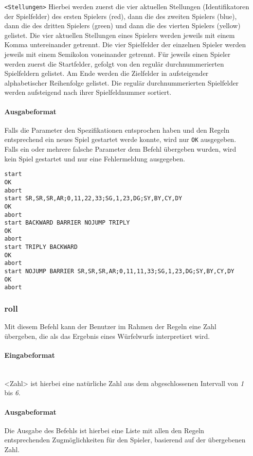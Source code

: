 \texttt{<Stellungen>} Hierbei werden zuerst die vier aktuellen Stellungen (Identifikatoren der Spielfelder) des ersten Spielers (red), dann die des zweiten Spielers (blue), dann die des dritten Spielers (green) und dann die des vierten Spielers (yellow) gelistet. Die vier aktuellen Stellungen eines Spielers werden jeweils mit einem Komma untereinander getrennt. Die vier Spielfelder der einzelnen Spieler werden jeweils mit einem Semikolon voneinander getrennt. Für jeweils einen Spieler werden zuerst die Startfelder, gefolgt von den regulär durchnummerierten Spielfeldern gelistet. Am Ende werden die Zielfelder in aufsteigender alphabetischer Reihenfolge gelistet. Die regulär durchnummerierten Spielfelder werden aufsteigend nach ihrer Spielfeldnummer sortiert.

\paragraph*{Ausgabeformat}
Falls die Parameter den Spezifikationen entsprochen haben und den Regeln entsprechend ein neues Spiel gestartet werde konnte, wird nur \texttt{OK} ausgegeben. Falls ein oder mehrere falsche Parameter dem Befehl übergeben wurden, wird kein Spiel gestartet und nur eine Fehlermeldung ausgegeben.

\begin{tcolorbox}[title=Beispiel]
\begin{verbatim}
start
OK
abort
start SR,SR,SR,AR;0,11,22,33;SG,1,23,DG;SY,BY,CY,DY
OK
abort
start BACKWARD BARRIER NOJUMP TRIPLY
OK
abort
start TRIPLY BACKWARD
OK
abort
start NOJUMP BARRIER SR,SR,SR,AR;0,11,11,33;SG,1,23,DG;SY,BY,CY,DY
OK
abort
\end{verbatim}
\end{tcolorbox}


\subsubsection*{roll}
Mit diesem Befehl kann der Benutzer im Rahmen der Regeln eine Zahl übergeben, die als das Ergebnis eines Würfelwurfs interpretiert wird.
\paragraph*{Eingabeformat}
\\
<Zahl> ist hierbei eine natürliche Zahl aus dem abgeschlossenen Intervall von \emph{1} bis \emph{6}.
\paragraph*{Ausgabeformat}
Die Ausgabe des Befehls ist hierbei eine Liste mit allen den Regeln entsprechenden Zugmöglichkeiten für den Spieler, basierend auf der übergebenen Zahl.

